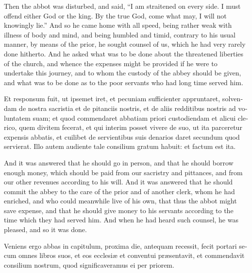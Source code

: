 \documentclass[10pt]{book}
\begin{document}
\begin{paracol}{2}
\switchcolumn

Then the abbot was disturbed, and said, ``I am straitened on every side. I must offend either God or the king. By the true God, come what may, I will not knowingly lie.'' And so he came home with all speed, being rather weak with illness of body and mind, and being humbled and timid, contrary to his usual manner, by means of the prior, he sought counsel of us, which he had very rarely done hitherto. And he asked what was to be done about the threatened liberties of the church, and whence the expenses might be provided if he were to undertake this journey, and to whom the custody of the abbey should be given, and what was to be done as to the poor servants who had long time served him.

\switchcolumn*

\begin{otherlanguage}{latin}
Et responsum fuit, ut ipsemet iret, et pecuniam sufficienter appruntaret, solvendam de nostra sacristia et de pitanciis nostris, et de aliis redditibus nostris ad voluntatem suam; et quod commendaret abbatiam priori custodiendam et alicui clerico, quem divitem fecerat, et qui interim posset vivere de suo, ut ita parceretur expensis abbatis, et cuilibet de servientibus suis denarios daret secundum quod servierat. Illo autem audiente tale consilium gratum habuit: et factum est ita.
\end{otherlanguage}

\switchcolumn

And it was answered that he should go in person, and that he should borrow enough money, which should be paid from our sacristry and pittances, and from our other revenues according to his will. And it was answered that he should commit the abbey to the care of the prior and of another clerk, whom he had enriched, and who could meanwhile live of his own, that thus the abbot might save expense, and that he should give money to his servants according to the time which they had served him. And when he had heard such counsel, he was pleased, and so it was done.

\switchcolumn*

\begin{otherlanguage}{latin}
Veniens ergo abbas in capitulum, proxima die, antequam recessit, fecit portari secum omnes libros suos, et eos ecclesi\ae{} et conventui pr\ae{}sentavit, et commendavit consilium nostrum, quod significaveramus ei per priorem.
\end{otherlanguage}


\end{paracol}
\end{document}
